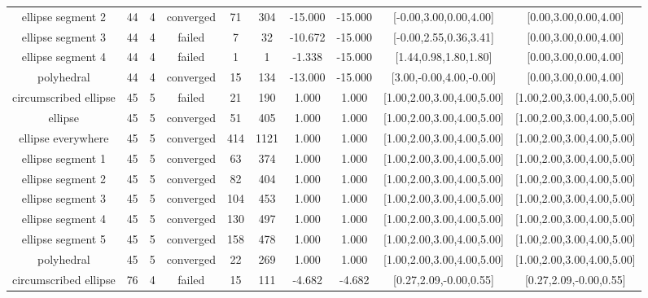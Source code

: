 \begin{tiny}
\begin{center}
\begin{tabular}{ c c c c c c c c c c }
    ellipse segment 2     &   44  &  4  & converged  &   71  &  304  &  -15.000   &  -15.000   & [-0.00,3.00,0.00,4.00] & [0.00,3.00,0.00,4.00] \\
    ellipse segment 3     &   44  &  4  &   failed   &   7   &   32  &  -10.672   &  -15.000   & [-0.00,2.55,0.36,3.41] & [0.00,3.00,0.00,4.00] \\
    ellipse segment 4     &   44  &  4  &   failed   &   1   &   1   &   -1.338   &  -15.000   & [1.44,0.98,1.80,1.80] & [0.00,3.00,0.00,4.00] \\
        polyhedral        &   44  &  4  & converged  &   15  &  134  &  -13.000   &  -15.000   & [3.00,-0.00,4.00,-0.00] & [0.00,3.00,0.00,4.00] \\
  circumscribed ellipse   &   45  &  5  &   failed   &   21  &  190  &   1.000    &   1.000    & [1.00,2.00,3.00,4.00,5.00] & [1.00,2.00,3.00,4.00,5.00] \\
         ellipse          &   45  &  5  & converged  &   51  &  405  &   1.000    &   1.000    & [1.00,2.00,3.00,4.00,5.00] & [1.00,2.00,3.00,4.00,5.00] \\
    ellipse everywhere    &   45  &  5  & converged  &  414  &  1121 &   1.000    &   1.000    & [1.00,2.00,3.00,4.00,5.00] & [1.00,2.00,3.00,4.00,5.00] \\
    ellipse segment 1     &   45  &  5  & converged  &   63  &  374  &   1.000    &   1.000    & [1.00,2.00,3.00,4.00,5.00] & [1.00,2.00,3.00,4.00,5.00] \\
    ellipse segment 2     &   45  &  5  & converged  &   82  &  404  &   1.000    &   1.000    & [1.00,2.00,3.00,4.00,5.00] & [1.00,2.00,3.00,4.00,5.00] \\
    ellipse segment 3     &   45  &  5  & converged  &  104  &  453  &   1.000    &   1.000    & [1.00,2.00,3.00,4.00,5.00] & [1.00,2.00,3.00,4.00,5.00] \\
    ellipse segment 4     &   45  &  5  & converged  &  130  &  497  &   1.000    &   1.000    & [1.00,2.00,3.00,4.00,5.00] & [1.00,2.00,3.00,4.00,5.00] \\
    ellipse segment 5     &   45  &  5  & converged  &  158  &  478  &   1.000    &   1.000    & [1.00,2.00,3.00,4.00,5.00] & [1.00,2.00,3.00,4.00,5.00] \\
        polyhedral        &   45  &  5  & converged  &   22  &  269  &   1.000    &   1.000    & [1.00,2.00,3.00,4.00,5.00] & [1.00,2.00,3.00,4.00,5.00] \\
  circumscribed ellipse   &   76  &  4  &   failed   &   15  &  111  &   -4.682   &   -4.682   & [0.27,2.09,-0.00,0.55] & [0.27,2.09,-0.00,0.55] \\

\end{tabular}
\end{center}
\end{tiny}
